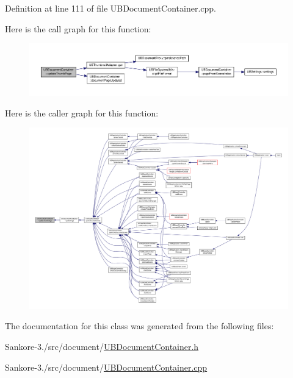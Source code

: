 Definition at line 111 of file U\-B\-Document\-Container.\-cpp.



Here is the call graph for this function\-:
\nopagebreak
\begin{figure}[H]
\begin{center}
\leavevmode
\includegraphics[width=350pt]{da/dc6/class_u_b_document_container_a0aa2ce35a38cac3cb81ef41b6e4ac04f_cgraph}
\end{center}
\end{figure}




Here is the caller graph for this function\-:
\nopagebreak
\begin{figure}[H]
\begin{center}
\leavevmode
\includegraphics[width=350pt]{da/dc6/class_u_b_document_container_a0aa2ce35a38cac3cb81ef41b6e4ac04f_icgraph}
\end{center}
\end{figure}




The documentation for this class was generated from the following files\-:\begin{DoxyCompactItemize}
\item 
Sankore-\/3./src/document/\hyperlink{_u_b_document_container_8h}{U\-B\-Document\-Container.\-h}\item 
Sankore-\/3./src/document/\hyperlink{_u_b_document_container_8cpp}{U\-B\-Document\-Container.\-cpp}\end{DoxyCompactItemize}
